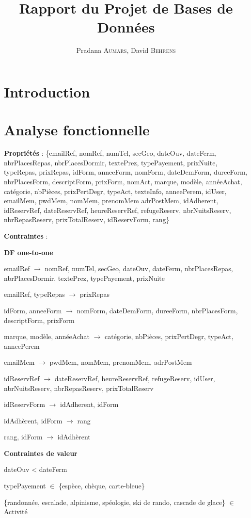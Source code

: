 \documentclass[12pt, a4paper]{article}
\title{Rapport du Projet de Bases de Données}
\author{Pradana \textsc{Aumars}, David \textsc{Behrens}}
\begin{document}
\maketitle
\section{Introduction}
\section{Analyse fonctionnelle}
\textbf{Propriétés} : \{emailRef, nomRef, numTel, secGeo, dateOuv, dateFerm, nbrPlacesRepas, nbrPlacesDormir, textePrez, typePayement, prixNuite, typeRepas, prixRepas, idForm, anneeForm, nomForm, dateDemForm, dureeForm, nbrPlacesForm, descriptForm, prixForm, nomAct, marque, modèle, annéeAchat, catégorie, nbPièces, prixPertDegr, typeAct, texteInfo, anneePerem, idUser, emailMem, pwdMem, nomMem, prenomMem adrPostMem, idAdherent, idReservRef, dateReservRef, heureReservRef, refugeReserv, nbrNuitsReserv, nbrRepasReserv, prixTotalReserv, idReservForm, rang\}

\textbf{Contraintes} :

\textbf{DF one-to-one}

emailRef $\rightarrow$ nomRef, numTel, secGeo, dateOuv, dateFerm, nbrPlacesRepas, nbrPlacesDormir, textePrez, typePayement, prixNuite

emailRef, typeRepas $\rightarrow$ prixRepas

idForm, anneeForm $\rightarrow$ nomForm, dateDemForm, dureeForm, nbrPlacesForm, descriptForm, prixForm

marque, modèle, annéeAchat $\rightarrow$ catégorie, nbPièces, prixPertDegr, typeAct, anneePerem

emailMem $\rightarrow$ pwdMem, nomMem, prenomMem, adrPostMem

idReservRef $\rightarrow$ dateReservRef, heureReservRef, refugeReserv, idUser, nbrNuitsReserv, nbrRepasReserv, prixTotalReserv

idReservForm $\rightarrow$ idAdherent, idForm

idAdhèrent, idForm $\rightarrow$ rang

rang, idForm $\rightarrow$ idAdhèrent

\textbf{Contraintes de valeur}

dateOuv < dateFerm

typePayement $\in$ \{espèce, chèque, carte-bleue\}

\{randonnée, escalade, alpinisme, spéologie, ski de rando, cascade de glace\} $\in$ Activité
\end{document}
